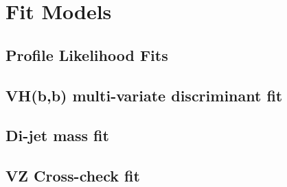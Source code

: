 \chapter{Fit Models}
\label{ch:fit-models}
\section{Profile Likelihood Fits}%
\label{sec:plf}
\section{VH(b,b) multi-variate discriminant fit}%
\label{sec:mva-fit}
\section{Di-jet mass fit}%
\label{sec:mbb-fit}
\section{VZ Cross-check fit}%
\label{sec:mvadiboson-fit}